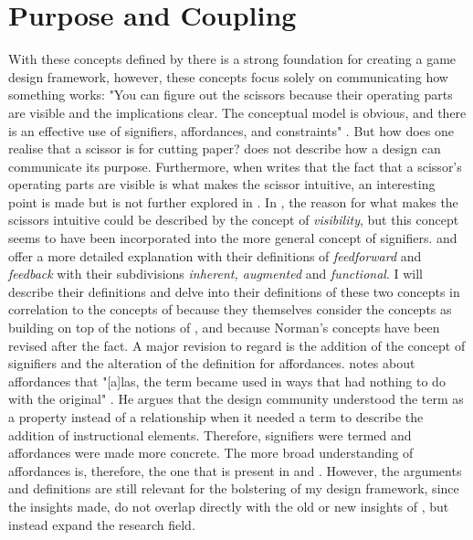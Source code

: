 \section{Purpose and Coupling}
With these concepts defined by  there is a strong foundation for creating a game design framework, however, these concepts focus solely on communicating how something works: "You can figure out the scissors because their operating parts are visible and the implications clear. The conceptual model is obvious, and there is an effective use of signifiers, affordances, and constraints" \cite[p. 27]{norman}. But how does one realise that a scissor is for cutting paper?  does not describe how a design can communicate its purpose. Furthermore, when  writes that the fact that a scissor's operating parts are visible is what makes the scissor intuitive, an interesting point is made but is not further explored in . In , the reason for what makes the scissors intuitive could be described by the concept of \textit{visibility}, but this concept seems to have been incorporated into the more general concept of signifiers.  and  offer a more detailed explanation with their definitions of \textit{feedforward} and \textit{feedback} with their subdivisions \textit{inherent, augmented} and \textit{functional}. I will describe their definitions and delve into their definitions of these two concepts in correlation to the concepts of  because they themselves consider the concepts as building on top of the notions of , and because Norman's concepts have been revised \cite{norman} after the fact. A major revision to regard is the addition of the concept of signifiers and the alteration of the definition for affordances.  notes about affordances that "[a]las, the term became used in ways that had nothing to do with the original" \cite[p. 13]{norman}. He argues that the design community understood the term as a property instead of a relationship when it needed a term to describe the addition of instructional elements. Therefore, signifiers were termed and affordances were made more concrete. The more broad understanding of affordances is, therefore, the one that is present in  and . However, the arguments and definitions are still relevant for the bolstering of my design framework, since the insights made, do not overlap directly with the old or new insights of , but instead expand the research field.

